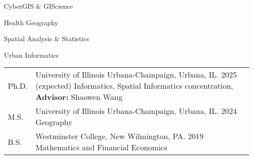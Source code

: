 \documentclass{acmcv}
\begin{document}
	\begin{multicols}{2}
		\begin{titemize}
			\item CyberGIS \& GIScience
			\item Health Geography
			\item Spatial Analysis \& Statistics
            \item Urban Informatics
		\end{titemize}
	\end{multicols}


    \begin{longtable}{p{0.1\linewidth} p{0.9\linewidth}}
        Ph.D. & University of Illinois Urbana-Champaign, Urbana, IL. 2025 (expected) \newline Informatics, Spatial Informatics concentration, \textbf{Advisor:} Shaowen Wang \\

        M.S. & University of Illinois Urbana-Champaign, Urbana, IL. 2024 \newline Geography\\

        B.S. & Westminster College, New Wilmington, PA. 2019 \newline Mathematics and Financial Economics\\
    \end{longtable}
    \vspace*{-0.25cm}

		\vspace{-.6cm}
        \nocite{*}
        \newrefcontext[labelprefix=J]
		\printbibliography[title={\normalsize {Journal Articles}},type=article, keyword=journalarticle]
		\vspace{-.8cm}
        \newrefcontext[labelprefix=C]
		\printbibliography[title={\normalsize {Peer-Reviewed Conference Papers}},type=inproceedings, keyword=confpaper]
		\vspace{-.8cm}
        \newrefcontext[labelprefix=A]
        \printbibliography[title={\normalsize {Conference Abstracts}}, keyword=extabs]
	
\end{document}
